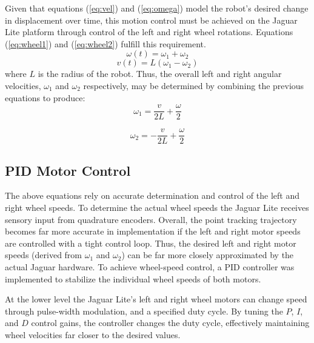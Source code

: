 \documentclass[conference]{IEEEtran}
\begin{document}
Given that equations  (\ref{eq:vel}) and (\ref{eq:omega}) model the robot's desired
 change in displacement over time, this motion control must be achieved on the Jaguar Lite platform
through control of the left and right wheel rotations.  Equations (\ref{eq:wheel1}) and (\ref{eq:wheel2}) fulfill 
this requirement.
\begin{equation}\label{eq:wheel1}
\omega(t) = \omega_1 + \omega_2 
\end{equation} 
\begin{equation}\label{eq:wheel2}
v(t) = L \left( \omega_1 - \omega_2 \right)
\end{equation}
where $L$ is the radius of the robot.
Thus, the overall left and right angular velocities, $\omega_1$ and $\omega_2$ respectively, may 
be determined by combining the previous equations to produce:
\begin{equation}
\omega_1 = \frac{v}{2L} + \frac{\omega}{2}
\end{equation}

\begin{equation}
\omega_2 = -\frac{v}{2L} + \frac{\omega}{2} 
\end{equation}

\subsection{PID Motor Control}
The above equations rely on accurate determination and control of the left and right
wheel speeds.  To determine the actual wheel speeds the Jaguar Lite receives 
sensory input from quadrature encoders. 
Overall, the point tracking trajectory becomes far more accurate in implementation
if the left and right motor speeds are controlled with a tight control loop.
Thus, the desired left and right motor speeds (derived from $\omega_1$ and $\omega_2$)
can be far more closely approximated by the actual Jaguar hardware.
To achieve wheel-speed control, a PID controller was implemented
to stabilize the individual wheel speeds of both motors.

At the lower level the Jaguar Lite's left and right wheel motors can 
change speed through pulse-width modulation, and a specified 
duty cycle.  By tuning the $P$, $I$, and $D$ control gains, the controller changes the 
duty cycle, effectively maintaining  
wheel velocities far closer to the desired values.

\end{document}
